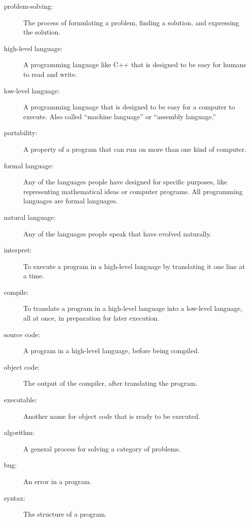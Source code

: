 \begin{description}

\item[problem-solving:]  The process of formulating a problem, finding
a solution, and expressing the solution.

\item[high-level language:]  A programming language like C++ that
is designed to be easy for humans to read and write.

\item[low-level language:]  A programming language that is designed
to be easy for a computer to execute.  Also called ``machine
language'' or ``assembly language.''

\item[portability:]  A property of a program that can run on more
than one kind of computer.

\item[formal language:]  Any of the languages people have designed
for specific purposes, like representing mathematical ideas or
computer programs.  All programming languages are formal languages.

\item[natural language:]  Any of the languages people speak that
have evolved naturally.

\item[interpret:]  To execute a program in a high-level language
by translating it one line at a time.

\item[compile:]  To translate a program in a high-level language
into a low-level language, all at once, in preparation for later
execution.

\item[source code:]  A program in a high-level language, before
being compiled.

\item[object code:]  The output of the compiler, after translating
the program.

\item[executable:]  Another name for object code that is ready
to be executed.

\item[algorithm:]  A general process for solving a category of
problems. 

\item[bug:]  An error in a program.

\item[syntax:]  The structure of a program.


\end{description}

